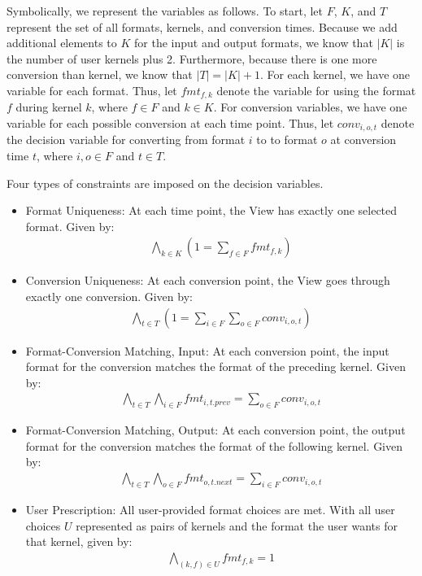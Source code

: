 \documentclass[sigconf,review=true]{acmart}
\begin{document}
Symbolically, we represent the variables as follows.
To start, let $F$, $K$, and $T$ represent the set of all formats, kernels, and conversion times.
Because we add additional elements to $K$ for the input and output formats, we know that $|K|$ is the number of user kernels plus 2.
Furthermore, because there is one more conversion than kernel, we know that $|T| = |K| + 1$.
For each kernel, we have one variable for each format. 
Thus, let $fmt_{f,k}$ denote the variable for using the format $f$ during kernel $k$, where $f \in F$ and $k \in K$.
For conversion variables, we have one variable for each possible conversion at each time point. 
Thus, let $conv_{i,o,t}$ denote the decision variable for converting from format $i$ to to format $o$ at conversion time $t$, where $i,o \in F$ and $t \in T$.

Four types of constraints are imposed on the decision variables.
\begin{itemize}
\item Format Uniqueness: At each time point, the View has exactly one selected format. Given by: 
\begin{align*}
	\bigwedge\limits_{k \in K} (1 = \sum\limits_{f \in F} fmt_{f,k})
\end{align*}
\item Conversion Uniqueness: At each conversion point, the View goes through exactly one conversion. Given by:
\begin{align*}
	\bigwedge\limits_{t \in T} (1 = \sum\limits_{i \in F}\sum\limits_{o \in F} conv_{i,o,t})
\end{align*}
\item Format-Conversion Matching, Input: At each conversion point, the input format for the conversion matches the format of the preceding kernel. Given by:
\begin{align*}
	\bigwedge\limits_{t \in T} \bigwedge\limits_{i \in F} fmt_{i,t.prev} = \sum\limits_{o \in F} conv_{i,o,t}
\end{align*}
\item Format-Conversion Matching, Output: At each conversion point, the output format for the conversion matches the format of the following kernel. Given by:
\begin{align*}
	\bigwedge\limits_{t \in T} \bigwedge\limits_{o \in F} fmt_{o,t.next} = \sum\limits_{i \in F} conv_{i,o,t}
\end{align*}
\item User Prescription: All user-provided format choices are met. With all user choices $U$ represented as pairs of kernels and the format the user wants for that kernel, given by:
\begin{align*}
	\bigwedge\limits_{(k,f) \in U}  fmt_{f,k} = 1
\end{align*}
\end{itemize}
\end{document}

